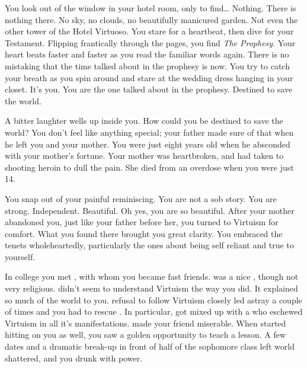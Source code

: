\documentclass[char]{guildcamp1}
\begin{document}
\name{\cBride{}}

You look out of the window in your hotel room, only to find{\ldots} Nothing. There is nothing there. No sky, no clouds, no beautifully manicured garden. Not even the other tower of the Hotel Virtuoso. You stare for a heartbeat, then dive for your Testament. Flipping frantically through the pages, you find {\em The Prophesy}. Your heart beats faster and faster as you read the familiar words again. There is no mistaking that the time talked about in the prophesy is now. You try to catch your breath as you spin around and stare at the wedding dress hanging in your closet. It's you. You are the one talked about in the prophesy. Destined to save the world.

A bitter laughter wells up inside you. How could you be destined to save the world? You don't feel like anything special; your father made sure of that when he left you and your mother. You were just eight years old when he absconded with your mother's fortune. Your mother was heartbroken, and had taken to shooting heroin to dull the pain. She died from an overdose when you were just 14.

You snap out of your painful reminiscing. You are not a sob story. You are strong. Independent. Beautiful. Oh yes, you are so beautiful. After your mother abandoned you, just like your father before her, you turned to Virtuism for comfort. What you found there brought you great clarity. You embraced the tenets wholeheartedly, particularly the ones about being self reliant and true to yourself.

In college you met \cRival{}, with whom you became fast friends. \cRival{\They} was a nice \cRival{\kid}, though not very religious. \cRival{\They} didn't seem to understand Virtuism the way you did. It explained so much of the world to you. \cRival{\Them} refusal to follow Virtuism closely led \cRival{} astray a couple of times and you had to rescue \cRival{\them}. In particular, \cRival{\they} got \cRival{\themself} mixed up with a \cRivalEx{\kid} who eschewed Virtuism in all it's manifestations. \cRivalEx{\They} made your friend miserable. When \cRivalEx{\they} started hitting on you as well, you saw a golden opportunity to teach \cRivalEx{\them} a lesson. A few dates and a dramatic break-up in front of half of the sophomore class left \cRivalEx{\their} world shattered, and you drunk with power.
\end{document}
